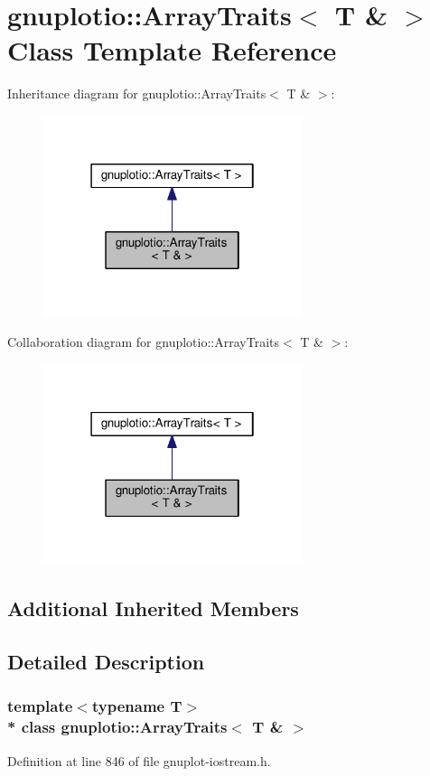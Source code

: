 \hypertarget{classgnuplotio_1_1_array_traits_3_01_t_01_6_01_4}{}\section{gnuplotio\+:\+:Array\+Traits$<$ T \& $>$ Class Template Reference}
\label{classgnuplotio_1_1_array_traits_3_01_t_01_6_01_4}


Inheritance diagram for gnuplotio\+:\+:Array\+Traits$<$ T \& $>$\+:
\nopagebreak
\begin{figure}[H]
\begin{center}
\leavevmode
\includegraphics[width=214pt]{classgnuplotio_1_1_array_traits_3_01_t_01_6_01_4__inherit__graph}
\end{center}
\end{figure}


Collaboration diagram for gnuplotio\+:\+:Array\+Traits$<$ T \& $>$\+:
\nopagebreak
\begin{figure}[H]
\begin{center}
\leavevmode
\includegraphics[width=214pt]{classgnuplotio_1_1_array_traits_3_01_t_01_6_01_4__coll__graph}
\end{center}
\end{figure}
\subsection*{Additional Inherited Members}


\subsection{Detailed Description}
\subsubsection*{template$<$typename T$>$\\*
class gnuplotio\+::\+Array\+Traits$<$ T \& $>$}



Definition at line 846 of file gnuplot-\/iostream.\+h.


